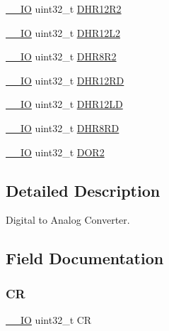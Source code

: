 \begin{DoxyCompactItemize}
\item 
\hyperlink{core__sc300_8h_aec43007d9998a0a0e01faede4133d6be}{\+\_\+\+\_\+\+IO} uint32\+\_\+t \hyperlink{struct_d_a_c___type_def_a804c7e15dbb587c7ea25511f6a7809f7}{D\+H\+R12\+R2}
\item 
\hyperlink{core__sc300_8h_aec43007d9998a0a0e01faede4133d6be}{\+\_\+\+\_\+\+IO} uint32\+\_\+t \hyperlink{struct_d_a_c___type_def_a2e45f9c9d67e384187b25334ba0a3e3d}{D\+H\+R12\+L2}
\item 
\hyperlink{core__sc300_8h_aec43007d9998a0a0e01faede4133d6be}{\+\_\+\+\_\+\+IO} uint32\+\_\+t \hyperlink{struct_d_a_c___type_def_a4c435f0e34ace4421241cd5c3ae87fc2}{D\+H\+R8\+R2}
\item 
\hyperlink{core__sc300_8h_aec43007d9998a0a0e01faede4133d6be}{\+\_\+\+\_\+\+IO} uint32\+\_\+t \hyperlink{struct_d_a_c___type_def_a1590b77e57f17e75193da259da72095e}{D\+H\+R12\+RD}
\item 
\hyperlink{core__sc300_8h_aec43007d9998a0a0e01faede4133d6be}{\+\_\+\+\_\+\+IO} uint32\+\_\+t \hyperlink{struct_d_a_c___type_def_acc269320aff0a6482730224a4b641a59}{D\+H\+R12\+LD}
\item 
\hyperlink{core__sc300_8h_aec43007d9998a0a0e01faede4133d6be}{\+\_\+\+\_\+\+IO} uint32\+\_\+t \hyperlink{struct_d_a_c___type_def_a9590269cba8412f1be96b0ddb846ef44}{D\+H\+R8\+RD}
\item 
\hyperlink{core__sc300_8h_aec43007d9998a0a0e01faede4133d6be}{\+\_\+\+\_\+\+IO} uint32\+\_\+t \hyperlink{struct_d_a_c___type_def_aba9fb810b0cf6cbc1280c5c63be2418b}{D\+O\+R2}
\end{DoxyCompactItemize}


\subsection{Detailed Description}
Digital to Analog Converter. 

\subsection{Field Documentation}
\mbox{\label{struct_d_a_c___type_def_ab40c89c59391aaa9d9a8ec011dd0907a}} 
\subsubsection{\texorpdfstring{CR}{CR}}
{\footnotesize\ttfamily \hyperlink{core__sc300_8h_aec43007d9998a0a0e01faede4133d6be}{\+\_\+\+\_\+\+IO} uint32\+\_\+t CR}

